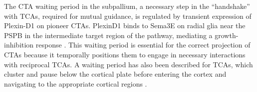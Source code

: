 \label{sec:CTAwaiting}
The CTA waiting period in the subpallium, a necessary step in the ``handshake'' with TCAs, required for mutual guidance, is regulated by transient expression of Plexin-D1 on pioneer CTAs. 
PlexinD1 binds to Sema3E on radial glia near the PSPB in the intermediate target region of the pathway, mediating a growth-inhibition response \cite{deck2013pathfinding}. 
This waiting period is essential for the correct projection of CTAs because it temporally positions them to engage in necessary interactions with reciprocal TCAs. 
A waiting period has also been described for TCAs, which cluster and pause below the cortical plate before entering the cortex and navigating to the appropriate cortical regions \cite{lund1977development,ghosh1992pathfinding,leyva2013and}.